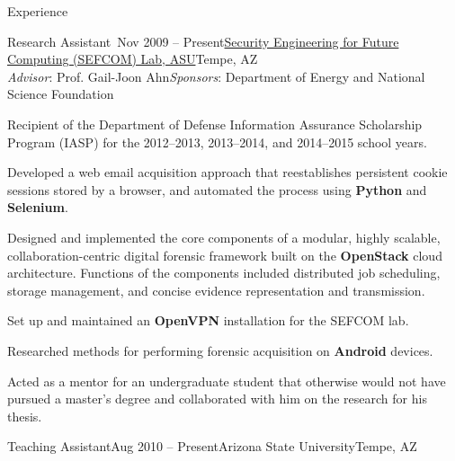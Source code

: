 \documentclass{resume} %
\begin{document}
\begin{rSection}{Experience}


\begin{rSubsection}{Research Assistant~}{Nov 2009 -- Present}{\href{http://sefcom.asu.edu/}{Security Engineering for Future Computing (SEFCOM) Lab, ASU}}{Tempe, AZ\\{\textnormal{\textit{Advisor}: Prof. Gail-Joon Ahn\hfill \textit{Sponsors}: Department of Energy and National Science Foundation}}}
	
	\item Recipient of the Department of Defense Information Assurance Scholarship Program (IASP) for the 2012--2013, 2013--2014, and 2014--2015 school years.
	
	\item Developed a web email acquisition approach that reestablishes persistent cookie sessions stored by a browser, and automated the process using \textbf{Python} and \textbf{Selenium}.
	
	\item Designed and implemented the core components of a modular, highly scalable, collaboration-centric digital forensic framework built on the \textbf{OpenStack} cloud architecture. Functions of the components included distributed job scheduling, storage management, and concise evidence representation and transmission.
	
	\item Set up and maintained an \textbf{OpenVPN} installation for the SEFCOM lab.
		
	\item Researched methods for performing forensic acquisition on \textbf{Android} devices.
	
	\item Acted as a mentor for an undergraduate student that otherwise would not have pursued a master's degree and collaborated with him on the research for his thesis.
	
\end{rSubsection}


\begin{rSubsection}{Teaching Assistant}{Aug 2010 -- Present}{Arizona State University}{Tempe, AZ}
	

\end{rSubsection}
\end{rSection}
\end{document}
